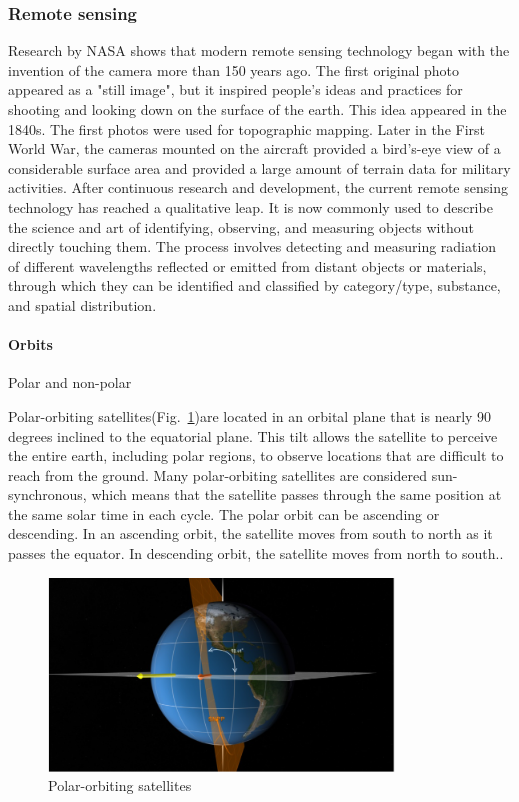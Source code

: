\documentclass[conference]{IEEEtran}
\newcommand{\subparagraph}{}
\begin{document}
	\subsubsection{Remote sensing}
	Research by NASA shows that modern remote sensing technology began with the invention of the camera more than 150 years ago. The 
	first original photo appeared as a "still image", but it inspired people's ideas and practices for shooting and looking down on 
	the surface of the earth. This idea appeared in the 1840s. The first photos were used for topographic mapping. Later in the First 
	World War, the cameras mounted on the aircraft provided a bird's-eye view of a considerable surface area and provided a large amount 
	of terrain data for military activities. After continuous research and development, the current remote sensing technology has reached 
	a qualitative leap. It is now commonly used to describe the science and art of identifying, observing, and measuring objects without 
	directly touching them. The process involves detecting and measuring radiation of different wavelengths reflected or emitted from distant 
	objects or materials, through which they can be identified and classified by category/type, substance, and spatial distribution\cite{earthdata28:online}.

	\paragraph{Orbits} 
	
	\subparagraph{Polar and non-polar}
	
	Polar-orbiting satellites(Fig.~\ref{satellites})are located in an orbital plane that is nearly 90 degrees inclined to the equatorial 
	plane. This tilt allows the satellite to perceive the entire earth, including polar regions, to observe locations that are difficult 
	to reach from the ground. Many polar-orbiting satellites are considered sun-synchronous, which means that the satellite passes through 
	the same position at the same solar time in each cycle. The polar orbit can be ascending or descending. In an ascending orbit, the satellite 
	moves from south to north as it passes the equator. In descending orbit, the satellite moves from north to south..

\begin{figure}[htbp]
    \centerline{\includegraphics[width=260pt]{images/1.1.1.png}}
    \caption{Polar-orbiting satellites}
    \label{satellites}
\end{figure}
 
\end{document}
